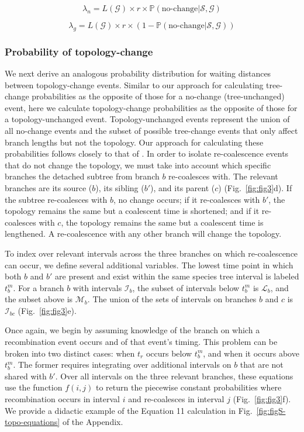 \documentclass[11pt]{article}
\begin{document}
\begin{equation}
	\lambda_{n} = 
	L(\mathcal{G}) \times r \times 
	\mathbb{P}(\text{no-change} | \mathcal{S},\mathcal{G})
\end{equation}

\begin{equation}
	\lambda_{g} = 
	L(\mathcal{G}) \times r \times 
	(1 - \mathbb{P}(\text{no-change} | \mathcal{S},\mathcal{G}))
\end{equation}


\subsubsection{Probability of topology-change}
We next derive an analogous probability distribution for waiting distances 
between topology-change events.
Similar to our approach for calculating tree-change probabilities as the opposite of those for a 
no-change (tree-unchanged) event, here we calculate topology-change probabilities as the 
opposite of those for a topology-unchanged event. Topology-unchanged events represent the union of 
all no-change events and the subset of possible tree-change events 
that only affect branch lengths but not the topology. 
Our approach for calculating these probabilities follows closely to that of
\citet{deng_distribution_2021}.
In order to isolate re-coalescence events that do not change the topology,
we must take into account which specific branches the detached subtree from 
branch $b$ re-coalesces with. The relevant branches are its source ($b$), 
its sibling ($b'$), and its parent ($c$) (Fig.~\ref{fig:fig3}d). 
If the subtree re-coalesces with $b$, no change occurs; if it re-coalesces
with $b'$, the topology remains the same but a coalescent time is shortened;
and if it re-coalesces with $c$, the topology remains the same but a coalescent 
time is lengthened. A re-coalescence with any other branch will change the topology.

To index over relevant intervals across the three branches on which re-coalescence
can occur, we define several additional variables. The lowest time point in which both 
$b$ and $b'$ are present and exist within the same species tree interval is labeled 
$t_b^m$. For a branch $b$ with intervals $\mathcal{I}_b$, the subset of intervals 
below $t_b^m$ is $\mathcal{L}_b$, and the subset above is $\mathcal{M}_b$. 
The union of the sets of intervals on branches $b$ and $c$ is $\mathcal{I}_{bc}$
(Fig.~\ref{fig:fig3}e).

Once again, we begin by assuming knowledge of the branch on which a 
recombination event occurs and of that event's timing. This problem can be broken 
into two distinct cases: when $t_r$ occurs below $t_b^m$, and when it 
occurs above $t_b^m$. The former requires integrating over additional 
intervals on $b$ that are not shared with $b'$. Over all intervals
on the three relevant branches, these equations use the function 
$f(i,j)$ to return the piecewise constant probabilities where recombination 
occurs in interval $i$ and re-coalesces in interval $j$ (Fig.~\ref{fig:fig3}f).
We provide a didactic example of the Equation 11 calculation 
in Fig.~\ref{fig:figS-topo-equations} of the Appendix.
\end{document}
